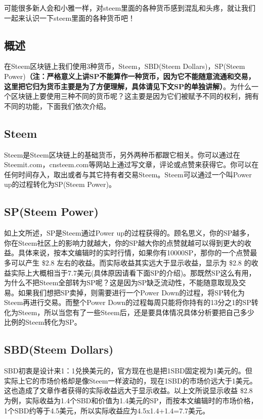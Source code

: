 \documentclass[]{ctexbook}
\begin{document}
可能很多新人会和小雅一样，对steem里面的各种货币感到混乱和头疼，就让我们一起来认识一下steem里面的各种货币吧！

\subsection{概述}

在Steem区块链上我们使用3种货币，Steem，SBD(Steem Dollars)，SP(Steem Power)\textbf{（注：严格意义上讲SP不能算作一种货币，因为它不能随意流通和交易，这里把它归为货币主要是为了方便理解，具体请见下文SP的单独讲解）}。为什么一个区块链上要使用三种不同的货币呢？这主要是因为它们被赋予不同的权利，拥有不同的功能，下面我们依次介绍。

\hypertarget{steem-1}{%
\subsection{Steem}\label{steem-1}}

Steem是Steem区块链上的基础货币，另外两种币都跟它相关。你可以通过在Steemit.com，cnsteem.com等网站上通过写文章，评论或点赞来获得它。你可以在任何时间存入，取出或者与其它持有者交易Steem。Steem可以通过一个叫Power up的过程转化为SP(Steem Power)。

\hypertarget{spsteem-power}{%
\subsection{SP(Steem Power)}\label{spsteem-power}}

如上文所述，SP是Steem通过Power up的过程获得的。顾名思义，你的SP越多，你在Steem社区上的影响力就越大，你的SP越大你的点赞就越可以得到更大的收益。具体来说，按本文编辑时的实时行情，如果你有10000SP，那你的一个点赞最多可以产生 \$2.8 左右的收益。而实际收益其实远大于显示收益，显示为 \$2.8 的收益实际上大概相当于7.7美元(具体原因请看下面SP的介绍)。那既然SP这么有用，为什么不把Steem全部转为SP呢？这是因为SP缺乏流动性，不能随意取现及交易。如果我们想把SP卖掉，则需要进行一个Power Down的过程，将SP转化为Steem再进行交易。而整个Power Down的过程每周只能将你持有的13分之1的SP转化为Steem，所以当您有了一些Steem后，还是要具体情况具体分析要把自己多少比例的Steem转化为SP。

\hypertarget{sbdsteem-dollars}{%
\subsection{SBD(Steem Dollars)}\label{sbdsteem-dollars}}

SBD初衷是设计来1：1兑换美元的，官方现在也是把1SBD固定视为1美元的。但实际上它的市场价格却是像Steem一样波动的，现在1SBD的市场价远大于1美元。这也造成了文章作者获得的实际收益远大于显示收益。以上文所说显示收益 \$2.8 为例，实际收益为1.4个SBD和价值为1.4美元的SP，而按本文编辑时的市场价格，1个SBD约等于4.5美元，所以实际收益应为4.5x1.4+1.4=7.7美元。
\end{document}
